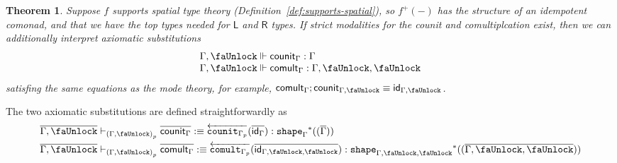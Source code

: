 \documentclass[10pt]{article}
\newtheorem{theorem}{Theorem}
\theoremstyle{definition}
\newcommand{\yields}{\vdash}
\newcommand{\id}{\mathsf{id}}
\newcommand{\rewrite}[2]{\overleftarrow{#1}(#2)}
\newcommand\St[2]{\ensuremath{{#1}^*(#2)}}
\newcommand\TrPlus[2]{\ensuremath{{#1}^+(#2)}}
\newcommand\ctxtuple[1]{(#1)}
\newcommand{\modeof}[1]{{#1}_p}
\newcommand{\tshape}[1]{\ensuremath{\mathtt{shape}_{#1}}}
\newcommand{\qyields}{\Vdash}
\newcommand{\upstairs}[1]{\overline{#1}}
\newcommand{\lock}{\text{\faUnlock}}
\newcommand\fcomult[1]{\ensuremath{\mathtt{comult}_{#1}}}
\newcommand\fcounit[1]{\ensuremath{\mathtt{counit}_{#1}}}
\newcommand{\counit}[1]{\mathsf{counit}_{#1}}
\newcommand{\comult}[1]{\mathsf{comult}_{#1}}
\begin{document}
\begin{theorem}
Suppose $f$ supports spatial type theory
(Definition~\ref{def:supports-spatial}), so $\TrPlus{f}{-}$ has the
structure of an idempotent comonad, and that we have the
top types needed for $\mathsf{L}$ and $\mathsf{R}$ types.
If strict modalities for the counit and comultiplcation exist,
then we can additionally interpret axiomatic substitutions
\[
\begin{array}{l}
\Gamma, \lock \qyields \counit{\Gamma} : \Gamma\\
\Gamma, \lock \qyields \comult{\Gamma} : \Gamma, \lock, \lock
\end{array}
\]
satisfing the same equations as the mode theory, for example,
$\comult{\Gamma};\counit{\Gamma, \lock} \equiv \id_{\Gamma, \lock}$.
\end{theorem}


The two axiomatic substitutions are defined straightforwardly as
\begin{align*}
\upstairs{\Gamma, \lock} &\yields_{\modeof{(\Gamma, \lock)}} \upstairs{\counit{\Gamma}} :\equiv \rewrite{\fcounit{\modeof{\Gamma}}}{\upstairs{\id_{\Gamma}}} : \St{\tshape{\Gamma}}{\ctxtuple{\upstairs{\Gamma}}} \\
\upstairs{\Gamma, \lock} &\yields_{\modeof{(\Gamma, \lock)}} \upstairs{\comult{\Gamma}} :\equiv \rewrite{\fcomult{\modeof{\Gamma}}}{\upstairs{\id_{\Gamma, \lock, \lock}}} : \St{\tshape{\Gamma, \lock, \lock}}{\ctxtuple{\upstairs{\Gamma, \lock, \lock}}}
\end{align*}
\end{document}
